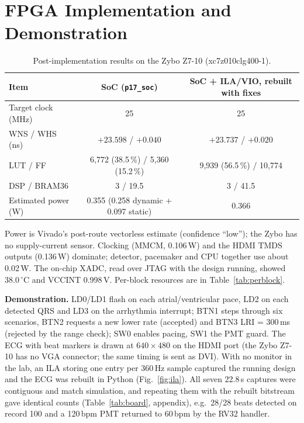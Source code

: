 \documentclass[11pt,a4paper]{article}
\begin{document}
\section{FPGA Implementation and Demonstration}
\label{sec:fpga}
\begin{table}[!tbp]\centering\footnotesize
\caption{Post-implementation results on the Zybo Z7-10 (xc7z010clg400-1).}\label{tab:fpga}
\begin{tabular}{@{}lcc@{}}
\toprule
Item & SoC (\texttt{p17\_soc}) & SoC + ILA/VIO, rebuilt with fixes\\
\midrule
Target clock (MHz) & 25 & 25\\
WNS / WHS (ns) & $+23.598$ / $+0.040$ & $+23.737$ / $+0.020$\\
LUT / FF & 6{,}772 (38.5\,\%) / 5{,}360 (15.2\,\%) & 9{,}939 (56.5\,\%) / 10{,}774\\
DSP / BRAM36 & 3 / 19.5 & 3 / 41.5\\
Estimated power (W) & 0.355 (0.258 dynamic + 0.097 static) & 0.366\\
\bottomrule
\end{tabular}
\end{table}

Power is Vivado's post-route vectorless estimate (confidence ``low''); the Zybo has no supply-current
sensor. Clocking (MMCM, 0.106\,W) and the HDMI TMDS outputs (0.136\,W) dominate; detector, pacemaker
and CPU together use about 0.02\,W. The on-chip XADC, read over JTAG with the design running, showed
38.0\,$^\circ$C and VCCINT 0.998\,V. Per-block resources are in Table~\ref{tab:perblock}.

\textbf{Demonstration.} LD0/LD1 flash on each atrial/ventricular pace, LD2 on each detected QRS and
LD3 on the arrhythmia interrupt; BTN1 steps through six scenarios, BTN2 requests a new lower rate
(accepted) and BTN3 LRI = 300\,ms (rejected by the range check); SW0 enables pacing, SW1 the PMT guard.
The ECG with beat markers is drawn at $640\times480$ on the HDMI port (the Zybo Z7-10 has no VGA
connector; the same timing is sent as DVI). With no monitor in the lab, an ILA storing one entry per
360\,Hz sample captured the running design and the ECG was rebuilt in Python (Fig.~\ref{fig:ila}). All seven 22.8\,s captures were contiguous and match simulation, and repeating them with the
rebuilt bitstream gave identical counts (Table~\ref{tab:board}, appendix), e.g.\
28/28 beats detected on record 100 and a 120\,bpm PMT returned to 60\,bpm by the RV32 handler.
\end{document}
